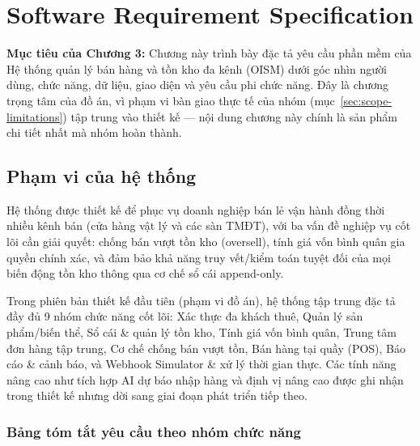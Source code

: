 \chapter{Software Requirement Specification}
\label{ch:3}

\noindent\textbf{Mục tiêu của Chương 3:} Chương này trình bày đặc tả yêu cầu phần mềm của Hệ thống quản lý bán hàng và tồn kho đa kênh (OISM) dưới góc nhìn người dùng, chức năng, dữ liệu, giao diện và yêu cầu phi chức năng. Đây là chương trọng tâm của đồ án, vì phạm vi bàn giao thực tế của nhóm (mục~\ref{sec:scope-limitations}) tập trung vào thiết kế — nội dung chương này chính là sản phẩm chi tiết nhất mà nhóm hoàn thành.

\section{Phạm vi của hệ thống}

Hệ thống được thiết kế để phục vụ doanh nghiệp bán lẻ vận hành đồng thời nhiều kênh bán (cửa hàng vật lý và các sàn TMĐT), với ba vấn đề nghiệp vụ cốt lõi cần giải quyết: chống bán vượt tồn kho (oversell), tính giá vốn bình quân gia quyền chính xác, và đảm bảo khả năng truy vết/kiểm toán tuyệt đối của mọi biến động tồn kho thông qua cơ chế sổ cái append-only.

Trong phiên bản thiết kế đầu tiên (phạm vi đồ án), hệ thống tập trung đặc tả đầy đủ 9 nhóm chức năng cốt lõi: Xác thực đa khách thuê, Quản lý sản phẩm/biến thể, Sổ cái \& quản lý tồn kho, Tính giá vốn bình quân, Trung tâm đơn hàng tập trung, Cơ chế chống bán vượt tồn, Bán hàng tại quầy (POS), Báo cáo \& cảnh báo, và Webhook Simulator \& xử lý thời gian thực. Các tính năng nâng cao như tích hợp AI dự báo nhập hàng và định vị nâng cao được ghi nhận trong thiết kế nhưng dời sang giai đoạn phát triển tiếp theo.







\subsection{Bảng tóm tắt yêu cầu theo nhóm chức năng}

